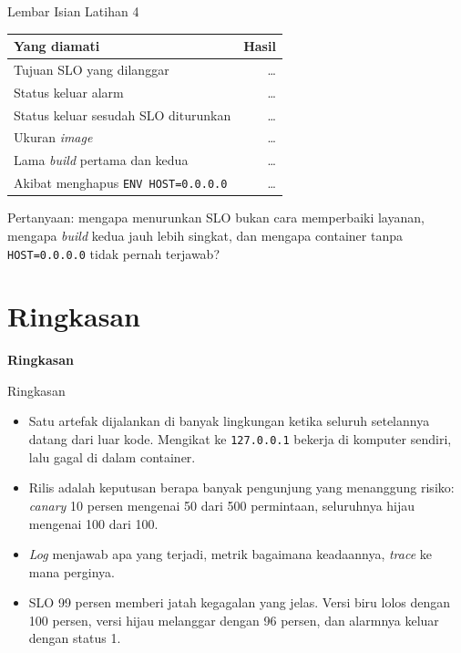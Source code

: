 \documentclass[aspectratio=169, table, 12pt]{beamer}
\begin{document}
\begin{frame}{{\Large Lembar Isian Latihan 4}}
  \vspace{6pt}
  \centering
  {\footnotesize
  \begin{tabularx}{\textwidth}{Yr}
    \hline
    \textbf{Yang diamati} & \textbf{Hasil} \\
    \hline
    Tujuan SLO yang dilanggar & \dots \\
    \hline
    Status keluar alarm & \dots \\
    \hline
    Status keluar sesudah SLO diturunkan & \dots \\
    \hline
    Ukuran \textit{image} & \dots \\
    \hline
    Lama \textit{build} pertama dan kedua & \dots \\
    \hline
    Akibat menghapus \texttt{ENV HOST=0.0.0.0} & \dots \\
    \hline
  \end{tabularx}}

  \vspace{6pt}
  {\footnotesize Pertanyaan: mengapa menurunkan SLO bukan cara memperbaiki
  layanan, mengapa \textit{build} kedua jauh lebih singkat, dan mengapa
  container tanpa \texttt{HOST=0.0.0.0} tidak pernah terjawab?}
\end{frame}

\section{Ringkasan}

\begin{frame}{\hfill}
  \centering
  \Huge{\textbf{Ringkasan}}
\end{frame}

\begin{frame}{{\Large Ringkasan}}
  \vspace{8pt}
  \begin{itemize}
    \item Satu artefak dijalankan di banyak lingkungan ketika seluruh
          setelannya datang dari luar kode. Mengikat ke \texttt{127.0.0.1}
          bekerja di komputer sendiri, lalu gagal di dalam container.
    \item Rilis adalah keputusan berapa banyak pengunjung yang menanggung
          risiko: \textit{canary} 10 persen mengenai 50 dari 500 permintaan,
          seluruhnya hijau mengenai 100 dari 100.
    \item \textit{Log} menjawab apa yang terjadi, metrik bagaimana
          keadaannya, \textit{trace} ke mana perginya.
    \item SLO 99 persen memberi jatah kegagalan yang jelas. Versi biru lolos
          dengan 100 persen, versi hijau melanggar dengan 96 persen, dan
          alarmnya keluar dengan status 1.
  \end{itemize}
\end{frame}
\end{document}
